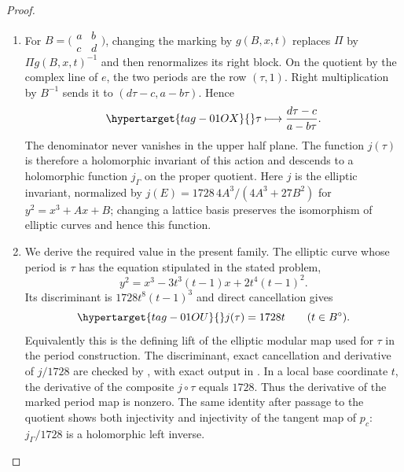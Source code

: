 \begin{proof}
\begin{enumerate}[label=\arabic*.,leftmargin=*]
\item For $B=\bigl(\begin{smallmatrix}a&b\\c&d\end{smallmatrix}\bigr)$, changing
the marking by $g(B,x,t)$ replaces $\Pi$ by $\Pi g(B,x,t)^{-1}$ and then
renormalizes its right block.  On the quotient by the complex line of
$e$, the two periods are the row $(\tau,1)$.  Right multiplication by
$B^{-1}$ sends it to $(d\tau-c,a-b\tau)$.  Hence
\begin{equation}\hypertarget{tag-01OX}{}\label{fam:eq:F-tauaction}
 \tau\longmapsto\frac{d\tau-c}{a-b\tau}.
\end{equation}
The denominator never vanishes in the upper half plane.  The function
$j(\tau)$ is therefore a holomorphic invariant of this action and
descends to a holomorphic function $j_\Gamma$ on the proper quotient.
Here $j$ is the elliptic invariant, normalized by
$j(E)=1728\,4A^3/(4A^3+27B^2)$ for $y^2=x^3+Ax+B$; changing a lattice
basis preserves the isomorphism of elliptic curves and hence this
function.

\item We derive the required value in the present family.  The elliptic curve
whose period is $\tau$ has the equation stipulated in the stated problem,
\[
 y^2=x^3-3t^3(t-1)x+2t^4(t-1)^2.
\]
Its discriminant is $1728t^8(t-1)^3$ and direct cancellation gives
\begin{equation}\hypertarget{tag-01OU}{}\label{fam:eq:F-j}
 j(\tau)=1728t\qquad(t\in B^\circ).
\end{equation}
Equivalently this is the defining lift of the elliptic modular map used
for $\tau$ in the period construction.  The discriminant, exact cancellation and derivative of
\(j/1728\) are checked by
,
with exact output in
.  In a local base coordinate $t$, the
derivative of the composite $j\circ\tau$ equals $1728$.  Thus the
derivative of the marked period map is nonzero.  The same identity after
passage to the quotient shows both injectivity and injectivity of the
tangent map of $p_c$: $j_\Gamma/1728$ is a holomorphic left inverse.


\end{enumerate}
\end{proof}
